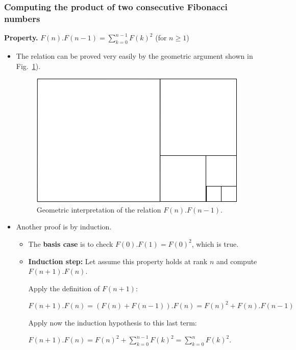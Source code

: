 \subsubsection{Computing the product of two consecutive Fibonacci numbers}

\noindent \textbf{Property.} 
\label{prop:FiboSumConsecutive}
$F(n).F(n-1)= \sum_{k=0}^{n-1} F(k)^2$ (for $n \geq 1$)

\begin{itemize}

\item The relation  
can be proved very easily by the geometric argument shown in Fig.~\ref{fig:fibosquare}). 

\begin{figure}[h]
\begin{center}
        \includegraphics[scale=0.5]{FiguresMaths//Fiboembedded}
        \caption{Geometric interpretation of the relation $F(n).F(n-1)$.}
        \label{fig:fibosquare}
\end{center}
\end{figure}

\item
Another proof is by induction.

\begin{itemize}
\item
The \textbf{basis case} is to check $F(0).F(1) = F(0)^2$, which is true.

\item
\textbf{Induction step:} Let assume this property holds at rank $n$ and compute $F(n+1).F(n)$.

Apply the definition of $F(n+1)$:

 $F(n+1).F(n) =  (F(n)+F(n-1)).F(n) = F(n)^2 +  F(n).F(n-1)$
 
 Apply now the induction hypothesis to this last term:
 
 $F(n+1).F(n) = F(n)^2 + \sum_{k=0}^{n-1} F(k)^2 = \sum_{k=0}^{n} F(k)^2$.
 \end{itemize}

\end{itemize}


